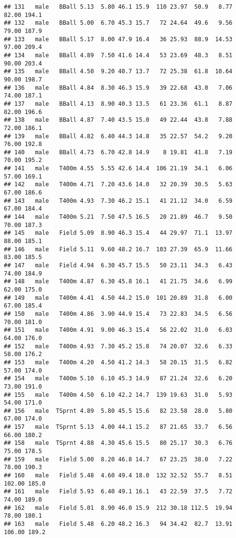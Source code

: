\documentclass[
]{article}
\begin{document}
\begin{verbatim}
## 131   male   BBall 5.13  5.80 46.1 15.9  110 23.97  50.9   8.77  82.00 194.1
## 132   male   BBall 5.00  6.70 45.3 15.7   72 24.64  49.6   9.56  79.00 187.9
## 133   male   BBall 5.17  8.00 47.9 16.4   36 25.93  88.9  14.53  97.00 209.4
## 134   male   BBall 4.89  7.50 41.6 14.4   53 23.69  48.3   8.51  90.00 203.4
## 135   male   BBall 4.50  9.20 40.7 13.7   72 25.38  61.8  10.64  90.00 198.7
## 136   male   BBall 4.84  8.30 46.3 15.9   39 22.68  43.0   7.06  74.00 187.1
## 137   male   BBall 4.13  8.90 40.3 13.5   61 23.36  61.1   8.87  82.00 196.6
## 138   male   BBall 4.87  7.40 43.5 15.0   49 22.44  43.8   7.88  72.00 186.1
## 139   male   BBall 4.82  6.40 44.3 14.8   35 22.57  54.2   9.20  76.00 192.8
## 140   male   BBall 4.73  6.70 42.8 14.9    8 19.81  41.8   7.19  70.00 195.2
## 141   male   T400m 4.55  5.55 42.6 14.4  106 21.19  34.1   6.06  57.00 169.1
## 142   male   T400m 4.71  7.20 43.6 14.0   32 20.39  30.5   5.63  67.00 186.6
## 143   male   T400m 4.93  7.30 46.2 15.1   41 21.12  34.0   6.59  67.00 184.4
## 144   male   T400m 5.21  7.50 47.5 16.5   20 21.89  46.7   9.50  70.00 187.3
## 145   male   Field 5.09  8.90 46.3 15.4   44 29.97  71.1  13.97  88.00 185.1
## 146   male   Field 5.11  9.60 48.2 16.7  103 27.39  65.9  11.66  83.00 185.5
## 147   male   Field 4.94  6.30 45.7 15.5   50 23.11  34.3   6.43  74.00 184.9
## 148   male   T400m 4.87  6.30 45.8 16.1   41 21.75  34.6   6.99  62.00 175.0
## 149   male   T400m 4.41  4.50 44.2 15.0  101 20.89  31.8   6.00  67.00 185.4
## 150   male   T400m 4.86  3.90 44.9 15.4   73 22.83  34.5   6.56  70.00 181.0
## 151   male   T400m 4.91  9.00 46.3 15.4   56 22.02  31.0   6.03  64.00 176.0
## 152   male   T400m 4.93  7.30 45.2 15.8   74 20.07  32.6   6.33  58.00 176.2
## 153   male   T400m 4.20  4.50 41.2 14.3   58 20.15  31.5   6.82  57.00 174.0
## 154   male   T400m 5.10  6.10 45.3 14.9   87 21.24  32.6   6.20  73.00 191.0
## 155   male   T400m 4.50  6.10 42.2 14.7  139 19.63  31.0   5.93  54.00 171.0
## 156   male  TSprnt 4.89  5.80 45.5 15.6   82 23.58  28.0   5.80  67.00 174.0
## 157   male  TSprnt 5.13  4.00 44.1 15.2   87 21.65  33.7   6.56  66.00 180.2
## 158   male  TSprnt 4.88  4.30 45.6 15.5   80 25.17  30.3   6.76  75.00 178.5
## 159   male   Field 5.00  8.20 46.8 14.7   67 23.25  38.0   7.22  78.00 190.3
## 160   male   Field 5.48  4.60 49.4 18.0  132 32.52  55.7   8.51 102.00 185.0
## 161   male   Field 5.93  6.40 49.1 16.1   43 22.59  37.5   7.72  74.00 189.0
## 162   male   Field 5.01  8.90 46.0 15.9  212 30.18 112.5  19.94  78.00 180.1
## 163   male   Field 5.48  6.20 48.2 16.3   94 34.42  82.7  13.91 106.00 189.2

\end{verbatim}
\end{document}
